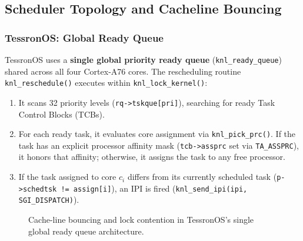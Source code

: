 \documentclass[10pt,journal,compsoc,twocolumn]{article}
\begin{document}
\subsection{Scheduler Topology and Cacheline Bouncing}

\subsubsection{TessronOS: Global Ready Queue}
TessronOS uses a \textbf{single global priority ready queue} (\texttt{knl\_ready\_queue}) shared across all four Cortex-A76 cores. The rescheduling routine \texttt{knl\_reschedule()} executes within \texttt{knl\_lock\_kernel()}:
\begin{enumerate}[leftmargin=*]
    \item It scans 32 priority levels (\texttt{rq->tskque[pri]}), searching for ready Task Control Blocks (TCBs).
    \item For each ready task, it evaluates core assignment via \texttt{knl\_pick\_prc()}. If the task has an explicit processor affinity mask (\texttt{tcb->assprc} set via \texttt{TA\_ASSPRC}), it honors that affinity; otherwise, it assigns the task to any free processor.
    \item If the task assigned to core $c_i$ differs from its currently scheduled task (\texttt{p->schedtsk != assign[i]}), an IPI is fired (\texttt{knl\_send\_ipi(ipi, SGI\_DISPATCH)}).
\end{enumerate}

\begin{figure}[t]
\centering
{}
\caption{Cache-line bouncing and lock contention in TessronOS's single global ready queue architecture.}
\label{fig:cache_bouncing}
\end{figure}
\end{document}
